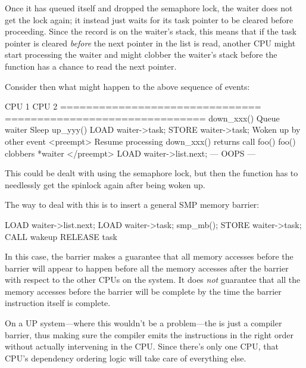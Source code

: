 Once it has queued itself and dropped the semaphore lock, the waiter does not
get the lock again; it instead just waits for its task pointer to be cleared
before proceeding.
Since the record is on the waiter's stack, this means that if the task
pointer is cleared \emph{before} the next pointer in the list is read,
another CPU might start processing the waiter and might clobber the waiter's
stack before the  function has a chance to read the next pointer.

Consider then what might happen to the above sequence of events:

\begin{VerbatimU}
	CPU 1                           CPU 2
	===============================	===============================
	                                down_xxx()
	                                Queue waiter
	                                Sleep
	up_yyy()
	LOAD waiter->task;
	STORE waiter->task;
	                                Woken up by other event
	<preempt>
	                                Resume processing
	                                down_xxx() returns
	                                call foo()
	                                foo() clobbers *waiter
	</preempt>
	LOAD waiter->list.next;
	--- OOPS ---
\end{VerbatimU}

This could be dealt with using the semaphore lock, but then the 
function has to needlessly get the spinlock again after being woken up.

The way to deal with this is to insert a general SMP memory barrier:

\begin{VerbatimU}
	LOAD waiter->list.next;
	LOAD waiter->task;
	smp_mb();
	STORE waiter->task;
	CALL wakeup
	RELEASE task
\end{VerbatimU}

In this case, the barrier makes a guarantee that all memory accesses before the
barrier will appear to happen before all the memory accesses after the barrier
with respect to the other CPUs on the system.
It does \emph{not} guarantee that all the memory accesses before the barrier
will be complete by the time the barrier instruction itself is complete.

On a UP system---where this wouldn't be a problem---the  is just a
compiler barrier, thus making sure the compiler emits the instructions in the
right order without actually intervening in the CPU.
Since there's only one CPU, that CPU's dependency ordering logic will take
care of everything else.


